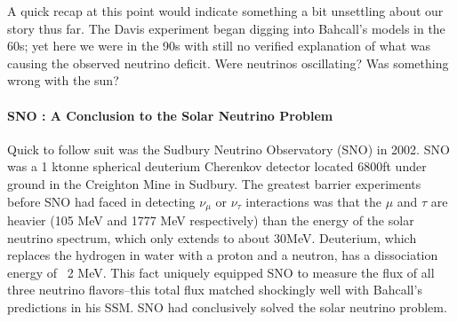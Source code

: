 \documentclass[12pt]{article}
\begin{document}
\par A quick recap at this point would indicate something a bit unsettling about our story thus far. The Davis experiment began digging into Bahcall's models in the 60s; yet here we were in the 90s with still no verified explanation of what was causing the observed neutrino deficit.  Were neutrinos oscillating? Was something wrong with the sun\cite{Clarke}? 


\paragraph{SNO : A Conclusion to the Solar Neutrino Problem}
Quick to follow suit was the Sudbury Neutrino Observatory (SNO) in 2002.  SNO was a 1 ktonne spherical deuterium Cherenkov detector located 6800ft under ground in the Creighton Mine in Sudbury\cite{sno}. The greatest barrier experiments before SNO had faced in detecting $\nu_\mu$ or $\nu_\tau$ interactions was that the $\mu$ and $\tau$ are heavier (105 MeV and 1777 MeV respectively) than the energy of the solar neutrino spectrum, which only extends to about 30MeV. Deuterium, which replaces the hydrogen in water with a proton and a neutron, has a dissociation energy of ~2 MeV. This fact uniquely equipped SNO to measure the flux of all three neutrino flavors\cite{sno}--this total flux matched shockingly well with Bahcall's predictions in his SSM. SNO had conclusively solved the solar neutrino problem.  
\end{document}
